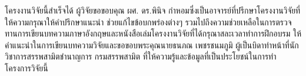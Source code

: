 โครงงานวิจัยนี้สำเร็จได้ ผู้วิจัยขอขอบคุณ ผศ. ดร.พินิจ  กำหอมซึ่งเป็นอาจารย์ที่ปรึกษาโครงงานวิจัยที่ให้ความกรุณาให้คำปรึกษาแนะนำ ช่วยแก้ไขข้อบกพร่องต่างๆ รวมไปถึงความช่วยเหลือในการตรวจทานการเขียนบทความภาษาอังกฤษและหนังสือเล่มโครงงานวิจัยที่ได้กรุณาสละเวลาทำการฝึกอบรม ให้คำแนะนำในการเขียนบทความวิจัยและขอขอบพระคุณนายธนภณ  เพชรชนมภูมิ ผู้เป็นบิดาทำหน้าที่นักวิชาการสรรพสามิตชำนาญการ กรมสรรพสามิต ที่ให้ความรู้และข้อมูลที่เป็นประโยชน์ในการทำโครงการวิจัยนี้